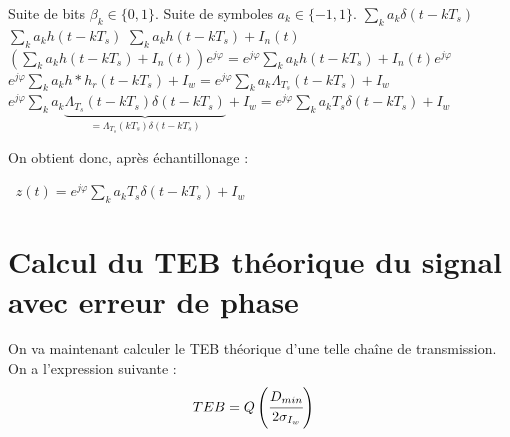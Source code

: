 \documentclass[11pt,a4paper]{report}
\begin{document}
\begin{tcolorbox}[colback=black!5!white,
                  colframe=black!70!white,
                  title=Cheminement du signal à travers la chaîne,
                  fonttitle=\bfseries,
                    subtitle style={boxrule=0.4pt,
                    colback=black!50!white!25!white,
                    colupper=black!90!white}
                 ]
    Suite de bits $\beta_k \in \{0,1\}.$ 
    Suite de symboles $a_k \in \{-1,1\}$.
    $\sum\limits_{k} a_k \delta\displaystyle\left(t - kT_s\right)$
    $\sum\limits_{k} a_k h\displaystyle\left(t - kT_s\right)$
    $\sum\limits_{k} a_k h\displaystyle\left(t - kT_s\right) + I_n(t)$
    $\displaystyle\left(\sum\limits_{k} a_k h\displaystyle\left(t - kT_s\right) + I_n\displaystyle\left(t\right)\right)e^{j\varphi} = e^{j\varphi}\sum\limits_{k} a_k h\displaystyle\left(t - kT_s\right) + I_n\displaystyle\left(t\right)e^{j\varphi}$
    $e^{j\varphi}\sum\limits_{k} a_k h \ast h_r \displaystyle\left(t - kT_s\right) + I_w = e^{j\varphi}\sum\limits_{k} a_k \Lambda_{T_s} \displaystyle\left(t - kT_s\right) + I_w$
    $e^{j\varphi}\sum\limits_{k} a_k \underbrace{\Lambda_{T_s} \displaystyle\left(t - kT_s\right) \delta\displaystyle\left(t - kT_s\right)}_{= \Lambda_{T_s} \displaystyle\left(kT_s\right) \delta\displaystyle\left(t - kT_s\right)} + I_w = e^{j\varphi}\sum\limits_{k} a_k T_s \delta\displaystyle\left(t - kT_s\right) + I_w$
\end{tcolorbox}

On obtient donc, après échantillonage :
\begin{center}
$~$
$z(t) = e^{j\varphi}\sum\limits_{k} a_k T_s \delta\displaystyle\left(t - kT_s\right) + I_w$
\end{center}


\vspace{0.5cm}

\section{Calcul du TEB théorique du signal avec erreur de phase}

On va maintenant calculer le TEB théorique d'une telle chaîne de transmission.
\newline
On a l'expression suivante :
\begin{align*}
    TEB & = Q\displaystyle\left(\cfrac{D_{min}}{2\sigma_{I_w}}\right)
\end{align*}
\end{document}
